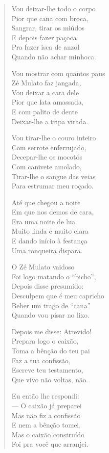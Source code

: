 \begin{verse}
Vou deixar-lhe todo o corpo\\
Pior que cana com broca,\\
Sangrar, tirar os miúdos\\
E depois fazer paçoca\\
Pra fazer isca de anzol\\
Quando não achar minhoca.

Vou mostrar com quantos paus\\
Zé Mulato faz jangada,\\
Vou deixar a cara dele\\
Pior que lata amassada,\\
E com palito de dente\\
Deixar-lhe a tripa virada.

Vou tirar-lhe o couro inteiro\\
Com serrote enferrujado, \\
Decepar-lhe os mocotós\\
Com canivete amolado,\\
Tirar-lhe o sangue das veias\\
Para estrumar meu roçado.
\pagebreak

Até que chegou a noite\\
Em que nos demos de cara,\\
Era uma noite de lua\\
Muito linda e muito clara\\
E dando início à festança\\
Uma ronqueira dispara.

O Zé Mulato vaidoso\\
Foi logo matando o “bicho”,\\
Depois disse presumido:\\
Desculpem que é meu capricho\\
Beber um trago de “cana”\\
Quando vou pisar no lixo.

Depois me disse: Atrevido!\\
Prepara logo o caixão,\\
Toma a bênção do teu pai\\
Faz a tua confissão,\\
Escreve teu testamento,\\
Que vivo não voltas, não.

Eu então lhe respondi: \\
— O caixão já preparei\\
Mas não fiz a confissão\\
E nem a bênção tomei,\\
Mas o caixão construído\\
Foi pra você que arranjei.
\pagebreak


\end{verse}
